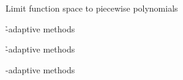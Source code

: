 \begin{frame}
\begin{minipage}[t]{.3\textwidth}
Limit function space to piecewise polynomials
\end{minipage}

\vspace{1.5em}

\begin{minipage}[t]{.3\textwidth}
\h-adaptive methods
\end{minipage}
\hfill
\begin{minipage}[t]{.3\textwidth}
\h-adaptive methods
\end{minipage}
\hfill
\begin{minipage}[t]{.3\textwidth}
\hp-adaptive methods
\end{minipage}
\end{frame}